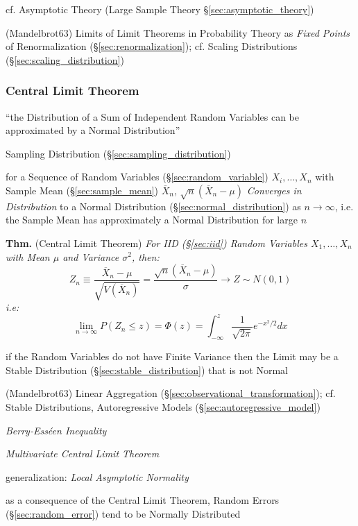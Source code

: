 \fist cf. Asymptotic Theory (Large Sample Theory \S\ref{sec:asymptotic_theory})

(Mandelbrot63) Limits of Limit Theorems in Probability Theory as \emph{Fixed
  Points} of Renormalization (\S\ref{sec:renormalization}); cf. Scaling
Distributions (\S\ref{sec:scaling_distribution})



\subsubsection{Central Limit Theorem}\label{sec:central_limit}

``the Distribution of a Sum of Independent Random Variables can be approximated
by a Normal Distribution''

\fist Sampling Distribution (\S\ref{sec:sampling_distribution})

for a Sequence of Random Variables (\S\ref{sec:random_variable})
$X_i, \ldots, X_n$ with Sample Mean (\S\ref{sec:sample_mean})
$\overline{X}_n$, $\sqrt{n}(\overline{X}_n - \mu)$
\emph{Converges in Distribution} to a Normal Distribution
(\S\ref{sec:normal_distribution}) as $n \to \infty$, i.e. the Sample
Mean has approximately a Normal Distribution for large $n$

\textbf{Thm.} (Central Limit Theorem) \emph{For IID (\S\ref{sec:iid}) Random
  Variables $X_1, \ldots, X_n$ with Mean $\mu$ and Variance $\sigma^2$, then:
  \[
    Z_n \equiv \frac{\overline{X}_n - \mu}{\sqrt{V(\overline{X}_n)}} =
      \frac{\sqrt{n}(\overline{X}_n - \mu)}{\sigma} \to Z \sim N(0,1)
  \]
  i.e:
  \[
    \lim_{n\to\infty} P(Z_n \leq z) = \Phi(z) =
      \int_{-\infty}^z \frac{1}{\sqrt{2\pi}}e^{-x^2/2} dx
  \]
}

\fist if the Random Variables do not have Finite Variance then the Limit may be
a Stable Distribution (\S\ref{sec:stable_distribution}) that is not Normal

(Mandelbrot63) Linear Aggregation (\S\ref{sec:observational_transformation});
cf. Stable Distributions, Autoregressive Models
(\S\ref{sec:autoregressive_model})

\emph{Berry-Ess\'een Inequality}

\emph{Multivariate Central Limit Theorem}

generalization: \emph{Local Asymptotic Normality}

as a consequence of the Central Limit Theorem, Random Errors
(\S\ref{sec:random_error}) tend to be Normally Distributed

